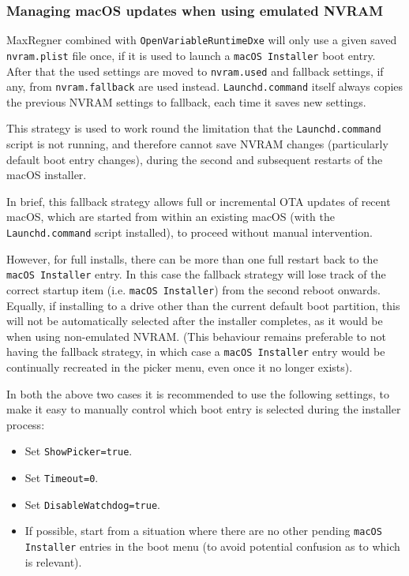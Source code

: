 \documentclass[]{article}
\providecommand{\tightlist}{%
  \setlength{\itemsep}{0pt}\setlength{\parskip}{0pt}}
\begin{document}
\subsubsection{Managing macOS updates when using emulated NVRAM}

MaxRegner combined with \texttt{OpenVariableRuntimeDxe} will only use a given saved \texttt{nvram.plist} file once,
if it is used to launch a \texttt{macOS Installer} boot entry. After that the used settings are moved to \texttt{nvram.used}
and fallback settings, if any, from \texttt{nvram.fallback} are used instead. \texttt{Launchd.command} itself
always copies the previous NVRAM settings to fallback, each time it saves new settings.

This strategy is used to work round the limitation that the \texttt{Launchd.command} script is not running,
and therefore cannot save NVRAM changes (particularly default boot entry changes), during the second
and subsequent restarts of the macOS installer.

In brief, this fallback strategy allows full or incremental OTA updates of recent macOS, which are started from within
an existing macOS (with the \texttt{Launchd.command} script installed), to proceed without manual intervention.

However, for full installs, there can be more than one full restart back to the \texttt{macOS Installer} entry. In this case
the fallback strategy will lose track of the correct startup item (i.e. \texttt{macOS Installer}) from the second reboot
onwards. Equally, if installing to a drive other than the current default boot partition, this will not be automatically selected after
the installer completes, as it would be when using non-emulated NVRAM. (This behaviour remains preferable to not having the fallback strategy,
in which case a \texttt{macOS Installer} entry would be continually recreated in the picker menu, even once it no longer exists).

In both the above two cases it is recommended to use the following settings, to make it easy to manually control which boot
entry is selected during the installer process:

\begin{itemize}
\tightlist
 \item Set \texttt{ShowPicker=true}.
 \item Set \texttt{Timeout=0}.
 \item Set \texttt{DisableWatchdog=true}.
 \item If possible, start from a situation where there are no other pending \texttt{macOS Installer} entries in the boot menu
 (to avoid potential confusion as to which is relevant).
\end{itemize}
\end{document}
